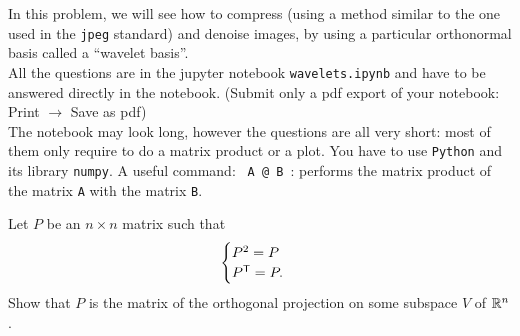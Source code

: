 \documentclass[11pt,nocut]{article}
\begin{document}
\begin{problem}[4 points]

	In this problem, we will see how to compress (using a method similar to the one used in the \texttt{jpeg} standard) and denoise images, by using a particular orthonormal basis called a ``wavelet basis''.
\\

All the questions are in the jupyter notebook \texttt{wavelets.ipynb} and have to be answered directly in the notebook. (Submit only a pdf export of your notebook: Print $\to$ Save as pdf)
\\

The notebook may look long, however the questions are all very short: most of them only require to do a matrix product or a plot.
You have to use \texttt{Python} and its library \texttt{numpy}. A useful command:
\texttt{ A @ B }: performs the matrix product of the matrix \texttt{A} with the matrix \texttt{B}.


\end{problem}

\vspace{1mm}

\begin{problem}[$\star$]
	Let $P$ be an $n \times n$ matrix such that
	$$
	\begin{cases}
		P^2 = P \\
		P^{{\sf T}} = P.
	\end{cases}
	$$
	Show that $P$ is the matrix of the orthogonal projection on some subspace $V$ of $\mathbb{R}^n$.
\end{problem}
\vspace{1cm}
\centerline{}

%
%
\end{document}
